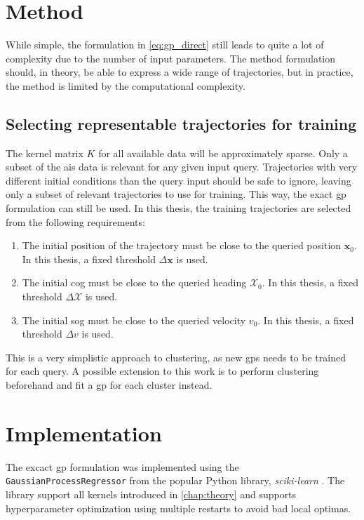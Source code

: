 \section{Method}
While simple, the formulation in \cref{eq:gp_direct} still leads to quite a lot of complexity due to the number of input parameters. The method formulation should, in theory, be able to express a wide range of trajectories, but in practice, the method is limited by the computational complexity.

\subsection{Selecting representable trajectories for training}
The kernel matrix $K$ for all available data will be approximately sparse. Only a subset of the \acrshort{ais} data is relevant for any given input query. Trajectories with very different initial conditions than the query input should be safe to ignore, leaving only a subset of relevant trajectories to use for training. This way, the exact \acrshort{gp} formulation can still be used.
In this thesis, the training trajectories are selected from the following requirements:
\begin{enumerate}
    \item The initial position of the trajectory must be close to the queried position $\boldsymbol{x}_0$. In this thesis, a fixed threshold $\Delta \boldsymbol{x}$ is used.
    \item The initial \acrshort{cog} must be close to the queried heading $\mathcal{X}_0$. In this thesis, a fixed threshold $\Delta \mathcal{X}$ is used. 
    \item The initial \acrshort{sog} must be close to the queried velocity $v_0$. In this thesis, a fixed threshold $\Delta v$ is used.
\end{enumerate} 

This is a very simplistic approach to clustering, as new \acrshort{gp}s needs to be trained for each query. A possible extension to this work is to perform clustering beforehand and fit a \acrshort{gp} for each cluster instead. 

\section{Implementation}
The excact \acrshort{gp} formulation was implemented using the \texttt{GaussianProcessRegressor} from the popular Python library, \textit{sciki-learn} \cite{scikit-learn}. The library support all kernels introduced in \cref{chap:theory} and supports hyperparameter optimization using multiple restarts to avoid bad local optimas. 

